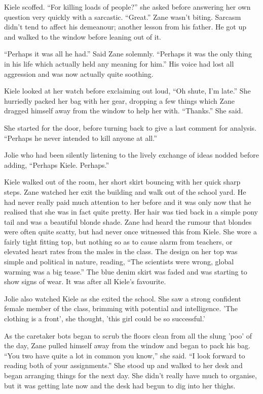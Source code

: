 Kiele scoffed.  ``For killing loads of people?'' she asked before answering her own question very quickly with  a sarcastic.  ``Great.''  Zane wasn't biting.  Sarcasm didn't tend to affect his demeanour; another lesson from his father.  He got up and walked to the window before leaning out of it.  

``Perhaps it was all he had.''  Said Zane solemnly.  ``Perhaps it was the only thing in his life which actually held any meaning for him.''  His voice had lost all aggression and was now actually quite soothing.  

Kiele looked at her watch before exclaiming out loud, ``Oh shute, I'm late.''  She hurriedly packed her bag with her gear, dropping a few things which Zane dragged himself away from the window to help her with.  ``Thanks.''  She said.

She started for the door, before turning back to give a last comment for analysis.  ``Perhaps he never intended to kill anyone at all.''

Jolie who had been silently listening to the lively exchange of ideas nodded before adding, ``Perhaps Kiele.  Perhaps.''  

Kiele walked out of the room, her short skirt bouncing with her quick sharp steps.  Zane watched her exit the building and walk out of the school yard.  He had never really paid much attention to her before and it was only now that he realised that she was in fact quite pretty.  Her hair was tied back in a simple pony tail and was a beautiful blonde shade.  Zane had heard the rumour that blondes were often quite scatty, but had never once witnessed this from Kiele.  She wore a fairly tight fitting top, but nothing so as to cause alarm from teachers, or elevated heart rates from the males in the class.  The design on her top was simple and political in nature, reading, ``The scientists were wrong, global warming was a big tease.''  The blue denim skirt was faded and was starting to show signs of wear.  It was after all Kiele's favourite.

Jolie also watched Kiele as she exited the school.  She saw a strong confident female member of the class, brimming with potential and intelligence.  'The clothing is a front', she thought, 'this girl could be so successful.'

As the caretaker bots began to scrub the floors clean from all the slung 'poo' of the day, Zane pulled himself away from the window and began to pack his bag.  ``You two have quite a lot in common you know,'' she said.  ``I look forward to reading both of your assignments.''  She stood up and walked to her desk and began arranging things for the next day.  She didn't really have much to organise, but it was getting late now and the desk had begun to dig into her thighs.

